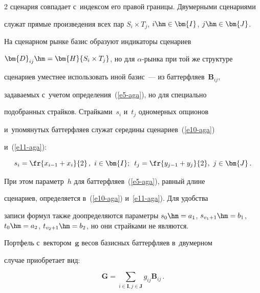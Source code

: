 \begin{multicols}{2}
сценария совпадает с~индексом его правой границы. Двумерными сценариями 


служат прямые произведения всех пар $S_i\times T_j$, $i\hm\in \bm{I}$, $j\hm\in 


\bm{J}$. 


  


  На сценарном рынке базис образуют индикаторы сценариев 


$\bm{D}_{ij}\hm=\bm{H}\{S_i\times T_j\}$, но для $\alpha$-рын\-ка при той же структуре 


сценариев уместнее использовать иной базис~--- из баттерфляев~$\bm{B}_{ij}$, 


задаваемых с~учетом определения~(\ref{e5-aga}), но для специально 


подобранных страйков. Страйками~$s_i$ и~$t_j$ одномерных опционов 


и~упомянутых баттерфляев служат середины сценариев~(\ref{e10-aga}) 


и~(\ref{e11-aga}): 


  $$


  s_i = \fr{x_{i-1} + x_i}{2}\,,\  i\in \bm{I}; \enskip   t_j = \fr{y_{j-1} + y_j}{2},\   j\in 


\bm{J}\,. 


  $$




  При этом параметр~$h$ для баттерфляев~(\ref{e5-aga}), равный длине 


сценариев, определяется в~(\ref{e10-aga}) и~\ref{e11-aga}). Для удобства 


записи формул также доопределяются параметры $s_0 \hm= a_1$, $s_{v_1+1}\hm = 


b_1$, $t_0 \hm= a_2$, $t_{v_2+1}\hm = b_2$, но они страйками не являются. 


  


  Портфель с~вектором~$\bm{g}$ весов базисных баттерфляев в~двумерном 


случае приобретает вид: 


  \begin{equation}


  \bm{G}= \sum\limits_{i\in \bm{I}, j\in \bm{J}} g_{ij} \bm{B}_{ij}\,.


  \label{e12-aga}


  \end{equation}


  



\end{multicols}
